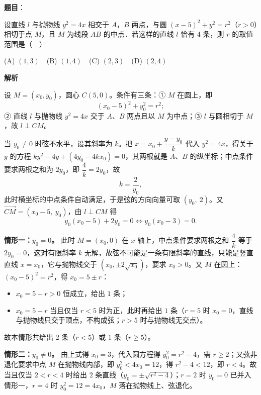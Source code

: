 \begin{answer}

\textbf{题目}：

设直线 \(l\) 与抛物线 \(y^2=4x\) 相交于 \(A\)，\(B\) 两点，与圆 \((x-5)^2+y^2=r^2\)（\(r>0\)）相切于点 \(M\)，且 \(M\) 为线段 \(AB\) 的中点．若这样的直线 \(l\) 恰有 4 条，则 \(r\) 的取值范围是（　）

(A) \((1,3)\)　(B) \((1,4)\)　(C) \((2,3)\)　(D) \((2,4)\)

\textbf{解析}

设 \(M=(x_0,y_0)\)，圆心 \(C(5,0)\)。条件有三条：① \(M\) 在圆上，即
\nopagebreak[4]
\[
(x_0-5)^2+y_0^2=r^2;
\]
② 直线 \(l\) 与抛物线 \(y^2=4x\) 交于 \(A\)、\(B\) 两点且以 \(M\) 为中点；③ \(l\) 与圆相切于 \(M\)，故 \(l\perp CM\)。

当 \(y_0\neq0\) 时弦不水平，设其斜率为 \(k\)。把 \(x=x_0+\dfrac{y-y_0}{k}\) 代入 \(y^2=4x\)，得关于 \(y\) 的方程 \(ky^2-4y+\left(4y_0-4kx_0\right)=0\)，其两根就是 \(A\)、\(B\) 的纵坐标；中点条件要求两根之和为 \(2y_0\)，即 \(\dfrac{4}{k}=2y_0\)，故
\nopagebreak[4]
\[
k=\dfrac{2}{y_0},
\]
此时横坐标的中点条件自动满足，于是弦的方向向量可取 \((y_0,\ 2)\)。又 \(\overrightarrow{CM}=(x_0-5,\ y_0)\)，由 \(l\perp CM\) 得
\nopagebreak[4]
\[
y_0(x_0-5)+2y_0=0\iff y_0(x_0-3)=0 .
\]

\textbf{情形一：\(y_0=0\)。} 此时 \(M=(x_0,0)\) 在 \(x\) 轴上，中点条件要求两根之和 \(\dfrac{4}{k}\) 等于 \(2y_0=0\)，这对有限斜率 \(k\) 无解，故弦不可能是一条有限斜率的直线，只能是竖直直线 \(x=x_0\)，它与抛物线交于 \((x_0,\pm2\sqrt{x_0})\)，要求 \(x_0>0\)。又 \(M\) 在圆上：\((x_0-5)^2=r^2\)，得 \(x_0=5\pm r\)：

\begin{itemize}
\item \(x_0=5+r>0\) 恒成立，给出 \(1\) 条；
\item \(x_0=5-r\) 当且仅当 \(r<5\) 时为正，此时再给出 \(1\) 条（\(r=5\) 时 \(x_0=0\)，直线与抛物线只交于顶点，不构成弦；\(r>5\) 时与抛物线无交点）。
\end{itemize}

故本情形共给出 \(2\) 条（\(r<5\)）或 \(1\) 条（\(r\geqslant5\)）。

\textbf{情形二：\(y_0\neq0\)。} 由上式得 \(x_0=3\)，代入圆方程得 \(y_0^2=r^2-4\)，需 \(r\geqslant2\)；又弦非退化要求中点 \(M\) 在抛物线内部，即 \(y_0^2<4x_0=12\)，得 \(r^2-4<12\)，即 \(r<4\)。故当且仅当 \(2<r<4\) 时给出 \(2\) 条直线（\(y_0=\pm\sqrt{r^2-4}\)）；\(r=2\) 时 \(y_0=0\) 已并入情形一，\(r=4\) 时 \(y_0^2=12=4x_0\)，\(M\) 落在抛物线上、弦退化。


\end{answer}
